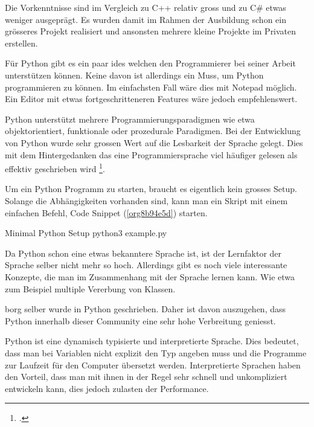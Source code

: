 Die Vorkenntnisse sind im Vergleich zu C++ relativ gross und zu C\# etwas
weniger ausgeprägt. Es wurden damit im Rahmen der Ausbildung schon ein
grösseres Projekt realisiert und ansonsten mehrere kleine Projekte im Privaten
erstellen.

Für Python gibt es ein paar \glspl{ide} welchen den Programmierer bei seiner
Arbeit unterstützen können. Keine davon ist allerdings ein Muss, um Python
programmieren zu können. Im einfachsten Fall wäre dies mit Notepad möglich. Ein
Editor mit etwas fortgeschritteneren Features wäre jedoch empfehlenswert.

Python unterstützt mehrere Programmierungsparadigmen wie etwa
objektorientiert, funktionale oder prozedurale Paradigmen. Bei der Entwicklung
von Python wurde sehr grossen Wert auf die Lesbarkeit der Sprache gelegt. Dies
mit dem Hintergedanken das eine Programmiersprache viel häufiger gelesen als
effektiv geschrieben wird \footcite{pep8}.

Um ein Python Programm zu starten, braucht es eigentlich kein grosses Setup.
Solange die Abhängigkeiten vorhanden sind, kann man ein Skript mit einem
einfachen Befehl, Code Snippet (\ref{org8b94e5d}) starten.

\begin{sexylisting}{Minimal Python Setup}
python3 example.py
\end{sexylisting}

Da Python schon eine etwas bekanntere Sprache ist, ist der Lernfaktor der
Sprache selber nicht mehr so hoch. Allerdings gibt es noch viele interessante
Konzepte, die man im Zusammenhang mit der Sprache lernen kann. Wie etwa zum
Beispiel multiple Vererbung von Klassen.

\gls{borg} selber wurde in Python geschrieben. Daher ist davon auszugehen, dass
Python innerhalb dieser Community eine sehr hohe Verbreitung geniesst.

Python ist eine dynamisch typisierte und interpretierte Sprache. Dies bedeutet,
dass man bei Variablen nicht explizit den Typ angeben muss und die Programme zur
Laufzeit für den Computer übersetzt werden. Interpretierte Sprachen haben den
Vorteil, dass man mit ihnen in der Regel sehr schnell und unkompliziert
entwickeln kann, dies jedoch zulasten der Performance.

